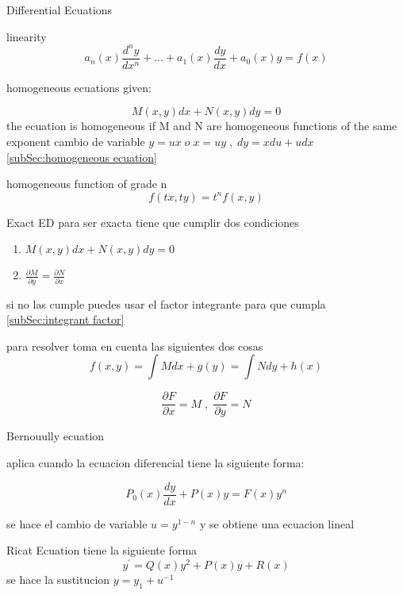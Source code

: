 \newpage
\begin{section}{Differential Ecuations}
	\begin{subsection}{linearity}
		$$ a_n(x) \frac{d^ny}{dx^n} + ... +  a_1(x) \frac{dy}{dx} + a_0(x)y = f(x)$$ 
	\end{subsection}
	\newpage
	\begin{subsection}{homogeneous ecuations}
		given:

		 $$M(x,y)dx + N(x,y)dy = 0$$
		 the ecuation is homogeneous if M and N are homogeneous functions of the same exponent
		cambio de variable $y=ux \; o \; x=uy \; , \; dy=xdu + udx $
		\autoref{subSec:homogeneous ecuation}{}
	\end{subsection}
	\begin{subsection}{homogeneous function of grade n}
		$$f(tx,ty) = t^nf(x,y)$$
		\label{subSec:homogeneous ecuation}
	\end{subsection}
	\begin{subsection}{Exact ED}
		para ser exacta tiene que cumplir dos condiciones 
	\begin{enumerate}
		\item $M(x,y)dx + N(x,y)dy = 0$
		\item $\frac{\partial M}{\partial y} = \frac{\partial N }{\partial x}$
	\end{enumerate}
	si no las cumple puedes usar el factor integrante para que cumpla
		\label{subSec:Exact ED}
		\autoref{subSec:integrant factor}{}


		para resolver toma en cuenta las siguientes dos cosas
		$$f(x,y) = \int M dx + g(y) = \int N dy + h(x) $$
	
	
		$$ \frac{ \partial F}{ \partial x} = M \; , \; \frac{ \partial F }{ \partial y} = N $$
	\end{subsection}
	\begin{subsection}{Bernouully ecuation}
	
		aplica cuando la ecuacion diferencial tiene la siguiente forma:
		
		$$P_0(x)\frac{dy}{dx} + P(x)y = F(x)y^n$$
		
		se hace el cambio de variable $u = y^{1-n}$ y se obtiene una ecuacion lineal
	
	
	\end{subsection}
	\begin{subsection}{Ricat Ecuation}
		 tiene la siguiente forma
		  $$y^{'} = Q(x)y^{2} + P(x)y + R(x)$$
		se hace la sustitucion $y=y_1 + u^{-1}$ 
	
	\end{subsection}


\end{section}
